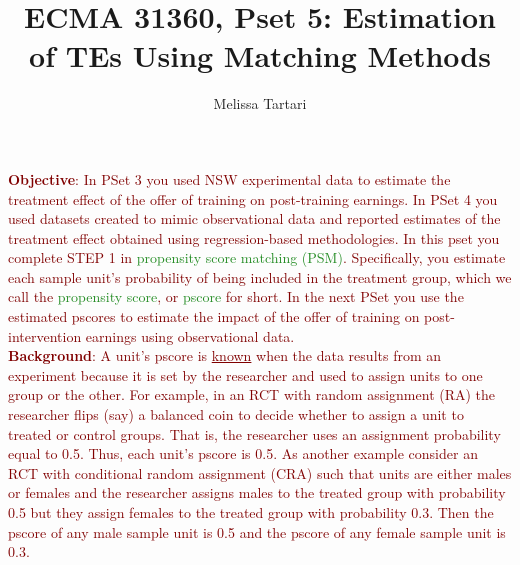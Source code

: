 \documentclass{article}
\newcommand{\psetnum}{5}
\begin{document}

\title{ECMA 31360, Pset \psetnum: Estimation of TEs Using Matching Methods}
\date{}
\author{Melissa Tartari}
\maketitle
\thispagestyle{fancy}


\noindent \textcolor{Maroon}{\textbf{Objective}: In PSet 3 you used NSW experimental data to estimate the treatment effect of the offer of training on post-training earnings. In PSet 4 you used datasets created to mimic observational data and reported estimates of the treatment effect obtained using regression-based methodologies. In this pset you complete STEP 1 in \textcolor{ForestGreen}{propensity score matching (PSM)}. Specifically, you estimate each sample unit's probability of being included in the treatment group, which we call the \textcolor{ForestGreen}{propensity score}, or \textcolor{ForestGreen}{pscore} for short. In the next PSet you use the estimated pscores to estimate the impact of the offer of training on post-intervention earnings using observational data.} \\

\noindent \textcolor{Maroon}{\textbf{Background}: A unit's pscore is \underline{known} when the data results from an experiment because it is set by the researcher and used to assign units to one group or the other. For example, in an RCT with random assignment (RA) the researcher flips (say) a balanced coin to decide whether to assign a unit to treated or control groups. That is, the researcher uses an assignment probability equal to 0.5. Thus, each unit's pscore is 0.5. As another example consider an RCT with conditional random assignment (CRA) such that units are either males or females and the researcher assigns males to the treated group with probability 0.5 but they assign females to the treated group with probability 0.3. Then the pscore of any male sample unit is 0.5 and the pscore of any female sample unit is 0.3.}\\
\end{document}
